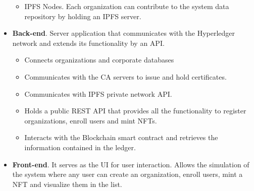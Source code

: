 \begin{itemize}
\begin{itemize}
        \item \ac{IPFS} Nodes. Each organization can contribute to the system data repository by holding an \ac{IPFS} server.
    \end{itemize}
    \item \textbf{Back-end}. Server application that communicates with the Hyperledger network and extends its functionality by an API. 
    \begin{itemize}
        \item Connects organizations and corporate databases
        \item Communicates with the \ac{CA} servers to issue and hold certificates.
        \item Communicates with \ac{IPFS} private network API. 
        \item Holds a public \ac{REST} \ac{API} that provides all the functionality to register organizations, enroll users and mint \ac{NFT}s.
        \item Interacts with the Blockchain smart contract and retrieves the information contained in the ledger. 
    \end{itemize}
    \item \textbf{Front-end}. It serves as the \ac{UI} for user interaction. Allows the simulation of the system where any user can create an organization, enroll users, mint a \ac{NFT} and visualize them in the list.
\end{itemize}